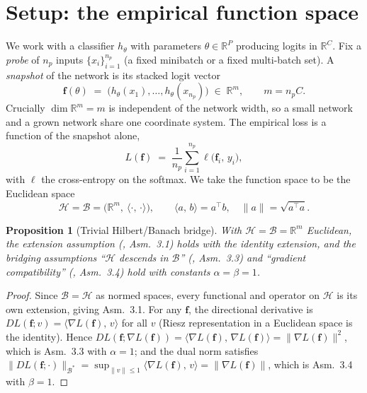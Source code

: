\documentclass[conference]{IEEEtran}
\newtheorem{proposition}{Proposition}
\theoremstyle{remark}
\newcommand{\R}{\mathbb{R}}
\newcommand{\inner}[2]{\langle #1,\, #2\rangle}
\newcommand{\norm}[1]{\lVert #1\rVert}
\newcommand{\grad}{\nabla}
\newcommand{\f}{\bm{f}}
\newcommand{\transpose}{^{\!\top}}
\begin{document}
\section{Setup: the empirical function space}
We work with a classifier $h_\theta$ with parameters $\theta\in\R^{P}$ producing
logits in $\R^{C}$. Fix a \emph{probe} of $n_p$ inputs $\{x_i\}_{i=1}^{n_p}$ (a
fixed minibatch or a fixed multi-batch set). A \emph{snapshot} of the network is
its stacked logit vector
\begin{equation}
\f(\theta)\;=\;\big(h_\theta(x_1),\dots,h_\theta(x_{n_p})\big)\;\in\;\R^{m},
\qquad m=n_p C .
\end{equation}
Crucially $\dim\R^m=m$ is independent of the network width, so a small network and
a grown network share one coordinate system. The empirical loss is a function of
the snapshot alone,
\begin{equation}
L(\f)\;=\;\frac1{n_p}\sum_{i=1}^{n_p}\ell\big(\f_i,\,y_i\big),
\end{equation}
with $\ell$ the cross-entropy on the softmax. We take the function space to be the
Euclidean space
\begin{equation}
\mathcal H=\mathcal B=\big(\R^{m},\ \inner{\cdot}{\cdot}\big),\qquad
\inner{a}{b}=a\transpose b,\quad \norm{a}=\sqrt{a\transpose a}.
\end{equation}

\begin{proposition}[Trivial Hilbert/Banach bridge]\label{prop:bridge}
With $\mathcal H=\mathcal B=\R^m$ Euclidean, the extension assumption
(\cite{fgd}, Asm.~3.1) holds with the identity extension, and the bridging
assumptions ``$\mathcal H$ descends in $\mathcal B$'' (\cite{fgd}, Asm.~3.3) and
``gradient compatibility'' (\cite{fgd}, Asm.~3.4) hold with constants
$\alpha=\beta=1$.
\end{proposition}
\begin{proof}
Since $\mathcal B=\mathcal H$ as normed spaces, every functional and operator on
$\mathcal H$ is its own extension, giving Asm.~3.1. For any $\f$, the directional
derivative is $DL(\f;v)=\inner{\grad L(\f)}{v}$ for all $v$ (Riesz representation
in a Euclidean space is the identity). Hence
$DL(\f;\grad L(\f))=\inner{\grad L(\f)}{\grad L(\f)}=\norm{\grad L(\f)}^2$, which is
Asm.~3.3 with $\alpha=1$; and the dual norm satisfies
$\norm{DL(\f;\cdot)}_{\mathcal B^\ast}=\sup_{\norm v\le1}\inner{\grad L(\f)}{v}
=\norm{\grad L(\f)}$, which is Asm.~3.4 with $\beta=1$.
\end{proof}
\end{document}
